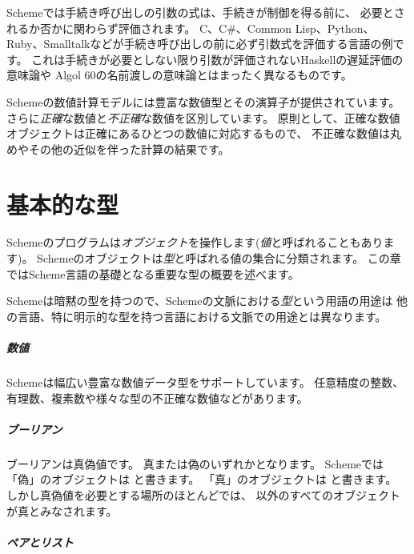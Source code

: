 Schemeでは手続き呼び出しの引数の式は、手続きが制御を得る前に、
必要とされるか否かに関わらず評価されます。
C、C\#、Common Lisp、Python、Ruby、Smalltalkなどが手続き呼び出しの前に必ず引数式を評価する言語の例です。
これは手続きが必要としない限り引数が評価されないHaskellの遅延評価の意味論や
Algol 60の名前渡しの意味論とはまったく異なるものです。

Schemeの数値計算モデルには豊富な数値型とその演算子が提供されています。
さらに\textit{正確}な数値と\textit{不正確}な数値を区別しています。
原則として、正確な数値オブジェクトは正確にあるひとつの数値に対応するもので、
不正確な数値は丸めやその他の近似を伴った計算の結果です。

\chapter{基本的な型}

Schemeのプログラムは\textit{オブジェクト}を操作します(\textit{値}と呼ばれることもあります)。
Schemeのオブジェクトは\textit{型}と呼ばれる値の集合に分類されます。
この章ではScheme言語の基礎となる重要な型の概要を述べます。

\begin{note}
  Schemeは暗黙の型を持つので、Schemeの文脈における\textit{型}という用語の用途は
  他の言語、特に明示的な型を持つ言語における文脈での用途とは異なります。
\end{note}

\paragraph{数値}

Schemeは幅広い豊富な数値データ型をサポートしています。
任意精度の整数、有理数、複素数や様々な型の不正確な数値などがあります。

\paragraph{ブーリアン}

ブーリアンは真偽値です。
真または偽のいずれかとなります。
Schemeでは「偽」のオブジェクトは \schfalse{} と書きます。
「真」のオブジェクトは \schtrue{} と書きます。
しかし真偽値を必要とする場所のほとんどでは、
\schfalse{} 以外のすべてのオブジェクトが真とみなされます。

\paragraph{ペアとリスト}

